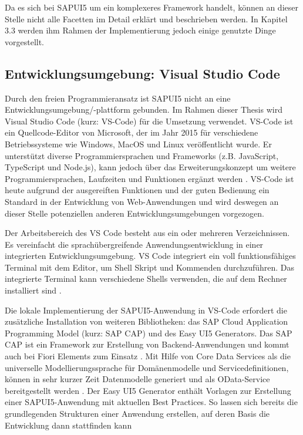 Da es sich bei SAPUI5 um ein komplexeres Framework handelt, können an dieser Stelle nicht alle Facetten im Detail erklärt und beschrieben werden. In Kapitel 3.3 werden ihm Rahmen der Implementierung jedoch einige genutzte Dinge vorgestellt.

\subsection{Entwicklungsumgebung: Visual Studio Code}
Durch den freien Programmieransatz ist SAPUI5 nicht an eine Entwicklungsumgebung/-plattform gebunden. Im Rahmen dieser Thesis wird Visual Studio Code (kurz: VS-Code) für die Umsetzung verwendet. VS-Code ist ein Quellcode-Editor von Microsoft, der im Jahr 2015 für verschiedene Betriebssysteme wie Windows, MacOS und Linux veröffentlicht wurde. Er unterstützt diverse Programmiersprachen und Frameworks (z.B. JavaScript, TypeScript und Node.js), kann jedoch über das Erweiterungskonzept um weitere Programmiersprachen, Laufzeiten und Funktionen ergänzt werden \cite{vsc:ov}. VS-Code ist heute aufgrund der ausgereiften Funktionen und der guten Bedienung ein Standard in der Entwicklung von Web-Anwendungen \cite{wiki:vsc} und wird deswegen an dieser Stelle potenziellen anderen Entwicklungsumgebungen vorgezogen.

Der Arbeitsbereich des VS Code besteht aus ein oder mehreren Verzeichnissen. Es vereinfacht die sprachübergreifende Anwendungsentwicklung in einer integrierten Entwicklungsumgebung. VS Code integriert ein voll funktionsfähiges Terminal mit dem Editor, um Shell Skript und Kommenden durchzuführen. Das integrierte Terminal kann verschiedene Shells verwenden, die auf dem Rechner installiert sind \cite{vsc:tb}.

Die lokale Implementierung der SAPUI5-Anwendung in VS-Code erfordert die zusätzliche Installation von weiteren Bibliotheken: das SAP Cloud Application Programming Model (kurz: SAP CAP) und des Easy UI5 Generators. Das SAP CAP ist ein Framework zur Erstellung von Backend-Anwendungen und kommt auch bei Fiori Elements zum Einsatz \cite{cap:ov}. Mit Hilfe von Core Data Services als die universelle Modellierungssprache für Domänenmodelle und Servicedefinitionen, können in sehr kurzer Zeit Datenmodelle generiert und als OData-Service bereitgestellt werden \cite{cap:ov}. Der Easy UI5 Generator enthält Vorlagen zur Erstellung einer SAPUI5-Anwendung mit aktuellen Best Practices. So lassen sich bereits die grundlegenden Strukturen einer Anwendung erstellen, auf deren Basis die Entwicklung dann stattfinden kann \cite{cap:geui5} 

